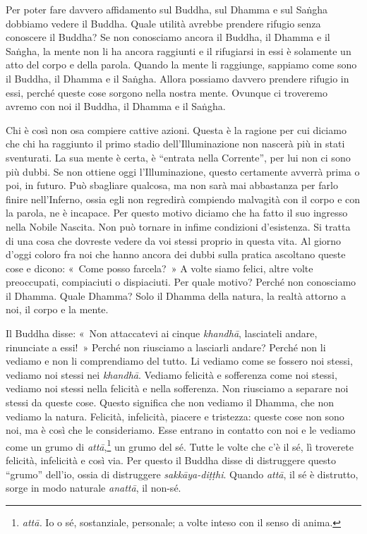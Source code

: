 Per poter fare davvero affidamento sul Buddha, sul Dhamma e sul Saṅgha
dobbiamo vedere il Buddha. Quale utilità avrebbe prendere rifugio senza
conoscere il Buddha? Se non conosciamo ancora il Buddha, il Dhamma e il
Saṅgha, la mente non li ha ancora raggiunti e il rifugiarsi in essi è
solamente un atto del corpo e della parola. Quando la mente li
raggiunge, sappiamo come sono il Buddha, il Dhamma e il Saṅgha. Allora
possiamo davvero prendere rifugio in essi, perché queste cose sorgono
nella nostra mente. Ovunque ci troveremo avremo con noi il Buddha, il
Dhamma e il Saṅgha.

Chi è così non osa compiere cattive azioni. Questa è la ragione per cui
diciamo che chi ha raggiunto il primo stadio dell'Illuminazione non
nascerà più in stati sventurati. La sua mente è certa, è ``entrata nella
Corrente'', per lui non ci sono più dubbi. Se non ottiene oggi
l'Illuminazione, questo certamente avverrà prima o poi, in futuro. Può
sbagliare qualcosa, ma non sarà mai abbastanza per farlo finire
nell'Inferno, ossia egli non regredirà compiendo malvagità con il corpo
e con la parola, ne è incapace. Per questo motivo diciamo che ha fatto
il suo ingresso nella Nobile Nascita. Non può tornare in infime
condizioni d'esistenza. Si tratta di una cosa che dovreste vedere da voi
stessi proprio in questa vita. Al giorno d'oggi coloro fra noi che hanno
ancora dei dubbi sulla pratica ascoltano queste cose e dicono: «~Come
posso farcela?~» A volte siamo felici, altre volte preoccupati,
compiaciuti o dispiaciuti. Per quale motivo? Perché non conosciamo il
Dhamma. Quale Dhamma? Solo il Dhamma della natura, la realtà attorno a
noi, il corpo e la mente.

Il Buddha disse: «~Non attaccatevi ai cinque \emph{khandhā}, lasciateli
andare, rinunciate a essi!~» Perché non riusciamo a lasciarli andare?
Perché non li vediamo e non li comprendiamo del tutto. Li vediamo come
se fossero noi stessi, vediamo noi stessi nei \emph{khandhā}. Vediamo
felicità e sofferenza come noi stessi, vediamo noi stessi nella felicità
e nella sofferenza. Non riusciamo a separare noi stessi da queste cose.
Questo significa che non vediamo il Dhamma, che non vediamo la natura.
Felicità, infelicità, piacere e tristezza: queste cose non sono noi, ma
è così che le consideriamo. Esse entrano in contatto con noi e le
vediamo come un grumo di \emph{attā},\footnote{\emph{attā.} Io o sé,
  sostanziale, personale; a volte inteso con il senso di anima.} un
grumo del sé. Tutte le volte che c'è il sé, lì troverete felicità,
infelicità e così via. Per questo il Buddha disse di distruggere questo
``grumo'' dell'io, ossia di distruggere \emph{sakkāya-diṭṭhi}. Quando
\emph{attā}, il sé è distrutto, sorge in modo naturale \emph{anattā}, il
non-sé.

